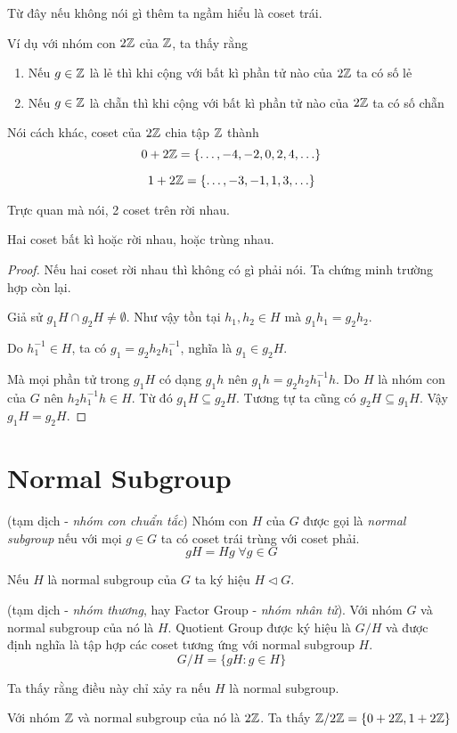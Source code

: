 Từ đây nếu không nói gì thêm ta ngầm hiểu là coset trái.

Ví dụ với nhóm con $2\mathbb{Z}$ của $\mathbb{Z}$, ta thấy rằng

\begin{enumerate}
    \item Nếu $g \in \mathbb{Z}$ là lẻ thì khi cộng với bất kì phần tử nào của $2\mathbb{Z}$ ta có số lẻ
    \item Nếu $g \in \mathbb{Z}$ là chẵn thì khi cộng với bất kì phần tử nào của $2\mathbb{Z}$ ta có số chẵn
\end{enumerate}

Nói cách khác, coset của $2\mathbb{Z}$ chia tập $\mathbb{Z}$ thành
\[0 + 2\mathbb{Z} = \{\ldots, -4, -2, 0, 2, 4, \ldots\}\]
 
\[1 + 2\mathbb{Z} = \{\ldots, -3, -1, 1, 3, \ldots \}\]

Trực quan mà nói, 2 coset trên rời nhau.

\begin{remark}
    Hai coset bất kì hoặc rời nhau, hoặc trùng nhau.
\end{remark}

\begin{proof}
    Nếu hai coset rời nhau thì không có gì phải nói. Ta chứng minh trường hợp còn lại.

    Giả sử $g_1 H \cap g_2 H \neq \emptyset$. Như vậy tồn tại $h_1, h_2 \in H$ mà $g_1 h_1 = g_2 h_2$.

    Do $h_1^{-1} \in H$, ta có $g_1 = g_2 h_2 h_1^{-1}$, nghĩa là $g_1 \in g_2 H$.

    Mà mọi phần tử trong $g_1 H$ có dạng $g_1 h$ nên $g_1 h = g_2 h_2 h_1^{-1} h$. Do $H$ là nhóm con của $G$ nên $h_2 h_1^{-1} h \in H$.
    Từ đó $g_1 H \subseteq g_2 H$. Tương tự ta cũng có $g_2 H \subseteq g_1 H$. Vậy $g_1 H = g_2 H$.
\end{proof}

\section{Normal Subgroup}

\begin{definition}
    (tạm dịch - \textit{nhóm con chuẩn tắc}) Nhóm con $H$ của $G$ được gọi là \textit{normal subgroup} nếu với mọi $g \in G$ ta có coset trái trùng với coset phải.
    \[gH = Hg \; \forall g \in G\]
\end{definition}

Nếu $H$ là normal subgroup của $G$ ta ký hiệu $H \triangleleft G$.

\begin{definition}
    (tạm dịch - \textit{nhóm thương}, hay Factor Group - \textit{nhóm nhân tử}). Với nhóm $G$ và normal subgroup của nó là $H$.
    Quotient Group được ký hiệu là $G / H$ và được định nghĩa là tập hợp các coset tương ứng với normal subgroup $H$.
    \[G / H = \{gH : g \in H \}\]

    Ta thấy rằng điều này chỉ xảy ra nếu $H$ là normal subgroup.
\end{definition}

\begin{example}
    Với nhóm $\mathbb{Z}$ và normal subgroup của nó là $2\mathbb{Z}$.
    Ta thấy $\mathbb{Z} / 2 \mathbb{Z} = \{0 + 2 \mathbb{Z}, 1 + 2 \mathbb{Z}\}$
\end{example}